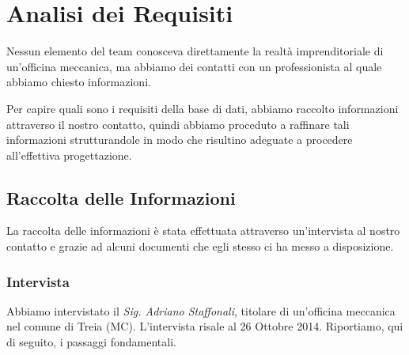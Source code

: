 \section{Analisi dei Requisiti}
\label{sec:req_analysis}

	Nessun elemento del team conosceva direttamente la realtà imprenditoriale di un'officina meccanica, ma abbiamo dei contatti con un professionista al quale abbiamo chiesto informazioni. 
	
	Per capire quali sono i requisiti della base di dati, abbiamo raccolto informazioni attraverso il nostro contatto, quindi abbiamo proceduto a raffinare tali informazioni strutturandole in modo che risultino adeguate a procedere all'effettiva progettazione.
	
	\subsection{Raccolta delle Informazioni}
		
		La raccolta delle informazioni è stata effettuata attraverso un'intervista al nostro contatto e grazie ad alcuni documenti che egli stesso ci ha messo a disposizione. 
	
		\subsubsection{Intervista}
		Abbiamo intervistato il \emph{Sig. Adriano Staffonali}, titolare di un'officina meccanica nel comune di Treia (MC). L'intervista risale al 26 Ottobre 2014. Riportiamo, qui di seguito, i passaggi fondamentali.

